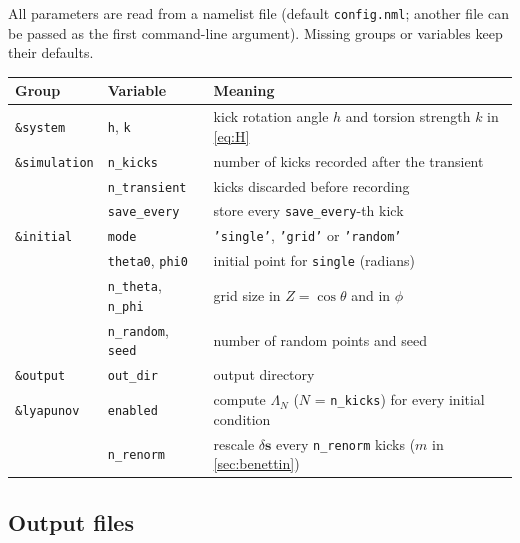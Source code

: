 \documentclass[11pt,a4paper]{article}
\newcommand{\vs}{\bm{s}}
\begin{document}
All parameters are read from a namelist file (default \texttt{config.nml}; another file can be passed as the first
command-line argument). Missing groups or variables keep their defaults.
\begin{center}
\small
\begin{tabular}{lll}
  \toprule
  Group & Variable & Meaning \\
  \midrule
  \texttt{\&system} & \texttt{h}, \texttt{k} & kick rotation angle $h$ and torsion strength $k$ in \eqref{eq:H} \\
  \texttt{\&simulation} & \texttt{n\_kicks} & number of kicks recorded after the transient \\
   & \texttt{n\_transient} & kicks discarded before recording \\
   & \texttt{save\_every} & store every \texttt{save\_every}-th kick \\
  \texttt{\&initial} & \texttt{mode} & \texttt{'single'}, \texttt{'grid'} or \texttt{'random'} \\
   & \texttt{theta0}, \texttt{phi0} & initial point for \texttt{single} (radians) \\
   & \texttt{n\_theta}, \texttt{n\_phi} & grid size in $Z=\cos\theta$ and in $\phi$ \\
   & \texttt{n\_random}, \texttt{seed} & number of random points and seed \\
  \texttt{\&output} & \texttt{out\_dir} & output directory \\
  \texttt{\&lyapunov} & \texttt{enabled} & compute $\Lambda_N$ ($N$ = \texttt{n\_kicks}) for every initial condition \\
   & \texttt{n\_renorm} & rescale $\delta\vs$ every \texttt{n\_renorm} kicks ($m$ in \cref{sec:benettin}) \\
  \bottomrule
\end{tabular}
\end{center}

\subsection{Output files}
\end{document}
